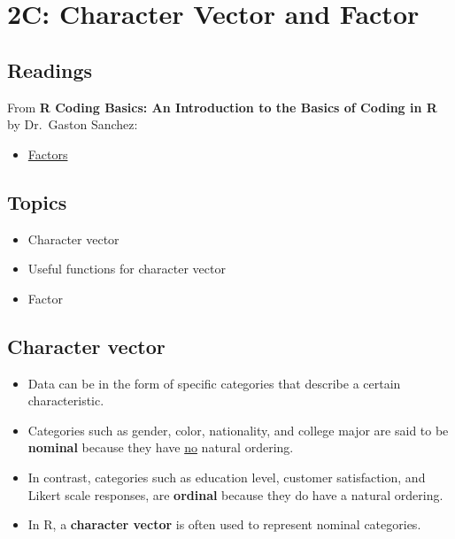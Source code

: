 \documentclass[
  letterpaper,
  DIV=11,
  numbers=noendperiod]{scrreprt}
\providecommand{\tightlist}{%
  \setlength{\itemsep}{0pt}\setlength{\parskip}{0pt}}\usepackage{longtable,booktabs,array}
\begin{document}
\chapter{2C: Character Vector and
Factor}\label{c-character-vector-and-factor}

\section{Readings}\label{readings-2}

From \textbf{R Coding Basics: An Introduction to the Basics of Coding in
R} by Dr.~Gaston Sanchez:

\begin{itemize}
\tightlist
\item
  \href{https://www.gastonsanchez.com/R-coding-basics/2-01-factors.html}{Factors}
\end{itemize}

\section{Topics}\label{topics-3}

\begin{itemize}
\item
  Character vector
\item
  Useful functions for character vector
\item
  Factor
\end{itemize}

\section{Character vector}\label{character-vector}

\begin{itemize}
\item
  Data can be in the form of specific categories that describe a certain
  characteristic.
\item
  Categories such as gender, color, nationality, and college major are
  said to be \textbf{nominal} because they have \ul{no} natural
  ordering.
\item
  In contrast, categories such as education level, customer
  satisfaction, and Likert scale responses, are \textbf{ordinal} because
  they do have a natural ordering.
\item
  In R, a \textbf{character vector} is often used to represent nominal
  categories.
\end{itemize}
\end{document}
